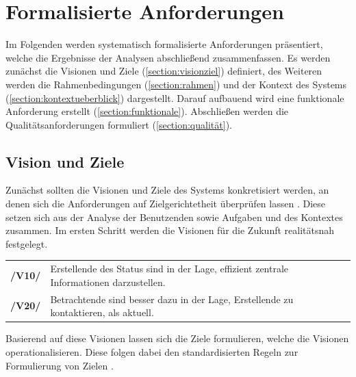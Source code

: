 \section{Formalisierte Anforderungen}
\label{section:anforderung}

Im Folgenden werden systematisch formalisierte Anforderungen präsentiert, welche die Ergebnisse der Analysen abschließend zusammenfassen.
Es werden zunächst die Visionen und Ziele (\ref{section:visionziel}) definiert, des Weiteren werden
die Rahmenbedingungen (\ref{section:rahmen}) und der Kontext des Systems
(\ref{section:kontextueberblick}) dargestellt. Darauf aufbauend wird eine funktionale Anforderung
erstellt (\ref{section:funktionale}). Abschließen werden die Qualitätsanforderungen formuliert
(\ref{section:qualität}).


\subsection*{Vision und Ziele}
\label{section:visionziel}
Zunächst sollten die Visionen und Ziele des Systems konkretisiert werden, an denen sich die
Anforderungen auf Zielgerichtetheit überprüfen lassen \cite{balzert2009}. Diese setzen sich aus der
Analyse der Benutzenden sowie Aufgaben und des Kontextes zusammen. Im ersten Schritt werden die
Visionen für die Zukunft realitätsnah festgelegt.



\begin{center}
        \renewcommand{\arraystretch}{1.5}
        \begin{tabular}{p{}p{}}
                \hline
                \textbf{/V10/} & Erstellende des Status sind in der Lage, effizient zentrale
                Informationen darzustellen.                                                  \\
                \textbf{/V20/} & Betrachtende sind besser dazu in der Lage, Erstellende zu
                kontaktieren, als aktuell.                                                   \\
                \hline
        \end{tabular}
\end{center}

Basierend auf diese Visionen lassen sich die Ziele formulieren, welche die Visionen
operationalisieren. Diese folgen dabei den standardisierten Regeln zur Formulierung von Zielen
\cite{pohl_requirements_2008}.


